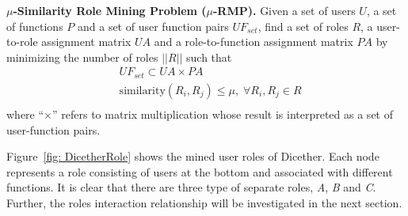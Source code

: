 \begin{definition}\label{def: mu}
	\textbf{$\mu$-Similarity Role Mining Problem ($\mu$-RMP).} 
	Given a set of users $U$, a set of functions $P$ and a set of user function pairs $\mathit{UF_{set}}$,
	find a set of roles $R$, a user-to-role assignment matrix $\mathit{UA}$ and a role-to-function assignment matrix $\mathit{PA}$
	by minimizing the number of roles $||R||$ such that
	\begin{align*}
		&\mathit{UF_{set}} \subset \mathit{UA} \times \mathit{PA} \\
		&\mathrm{similarity}(R_i, R_j) \leq \mu, \; \forall R_i, R_j \in R  \\
	\end{align*}
	where ``$\times$'' refers to matrix multiplication whose result is interpreted as a set of user-function pairs.
\end{definition}

Figure~\ref{fig: DicetherRole} shows the mined user roles of Dicether.
Each node represents a role consisting of users at the bottom and associated with different functions.
It is clear that there are three type of separate roles, \textit{A}, \textit{B} and \textit{C}. 
Further, the roles interaction relationship will be investigated in the next section.


